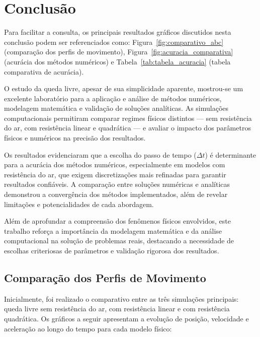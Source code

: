 \vspace{1em}


\chapter{Conclusão}
\label{chap_conclusao}

Para facilitar a consulta, os principais resultados gráficos discutidos nesta conclusão podem ser referenciados como: Figura~\ref{fig:comparativo_abc} (comparação dos perfis de movimento), Figura~\ref{fig:acuracia_comparativa} (acurácia dos métodos numéricos) e Tabela~\ref{tab:tabela_acuracia} (tabela comparativa de acurácia).

O estudo da queda livre, apesar de sua simplicidade aparente, mostrou-se um excelente laboratório para a aplicação e análise de métodos numéricos, modelagem matemática e validação de soluções analíticas. As simulações computacionais permitiram comparar regimes físicos distintos — sem resistência do ar, com resistência linear e quadrática — e avaliar o impacto dos parâmetros físicos e numéricos na precisão dos resultados.

Os resultados evidenciaram que a escolha do passo de tempo ($\Delta t$) é determinante para a acurácia dos métodos numéricos, especialmente em modelos com resistência do ar, que exigem discretizações mais refinadas para garantir resultados confiáveis. A comparação entre soluções numéricas e analíticas demonstrou a convergência dos métodos implementados, além de revelar limitações e potencialidades de cada abordagem.

Além de aprofundar a compreensão dos fenômenos físicos envolvidos, este trabalho reforça a importância da modelagem matemática e da análise computacional na solução de problemas reais, destacando a necessidade de escolhas criteriosas de parâmetros e validação rigorosa dos resultados.
 

\section*{Comparação dos Perfis de Movimento}


Inicialmente, foi realizado o comparativo entre as três simulações principais: queda livre sem resistência do ar, com resistência linear e com resistência quadrática. Os gráficos a seguir apresentam a evolução de posição, velocidade e aceleração ao longo do tempo para cada modelo físico:


